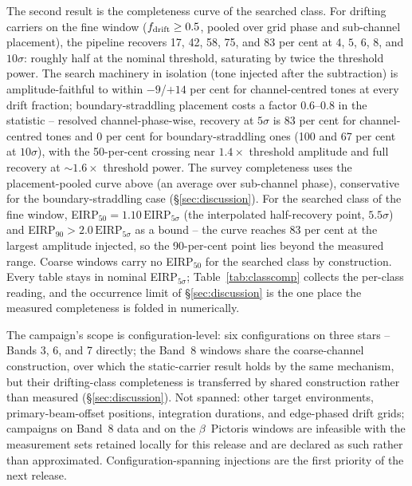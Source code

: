 \documentclass{openjournal}
\begin{document}
The second result is the completeness curve of the searched class.
For drifting carriers on the fine window ($f_{\rm drift}\geq0.5$,
pooled over grid phase and sub-channel placement), the pipeline
recovers 17, 42, 58, 75, and 83 per cent at $4$, $5$, $6$, $8$, and
$10\sigma$: roughly half at the nominal threshold, saturating by
twice the threshold power. The search machinery in isolation (tone
injected after the subtraction) is amplitude-faithful to within
$-9$/$+14$ per cent for channel-centred tones at every drift
fraction; boundary-straddling placement costs a factor $0.6$--$0.8$
in the statistic -- resolved channel-phase-wise, recovery at $5\sigma$
is 83 per cent for channel-centred tones and 0 per cent for
boundary-straddling ones (100 and 67 per cent at $10\sigma$), with
the 50-per-cent crossing near $1.4\times$ threshold amplitude and
full recovery at ${\sim}1.6\times$ threshold power. The survey
completeness uses the placement-pooled curve above (an average over
sub-channel phase), conservative for the boundary-straddling case
(\S\ref{sec:discussion}). For the searched class of the fine window,
EIRP$_{50} = 1.10\,\mathrm{EIRP}_{5\sigma}$ (the interpolated
half-recovery point, $5.5\sigma$) and
EIRP$_{90} > 2.0\,\mathrm{EIRP}_{5\sigma}$ as a bound -- the curve
reaches 83 per cent at the largest amplitude injected, so the
90-per-cent point lies beyond the measured range. Coarse windows
carry no EIRP$_{50}$ for the searched class by construction. Every
table stays in nominal EIRP$_{5\sigma}$; Table~\ref{tab:classcomp}
collects the per-class reading, and the occurrence limit of
\S\ref{sec:discussion} is the one place the measured completeness is
folded in numerically.

The campaign's scope is configuration-level: six configurations on
three stars -- Bands 3, 6, and 7 directly; the Band~8 windows share
the coarse-channel construction, over which the static-carrier result
holds by the same mechanism, but their drifting-class completeness is
transferred by shared construction rather than measured
(\S\ref{sec:discussion}). Not spanned: other target environments,
primary-beam-offset positions, integration durations, and edge-phased
drift grids; campaigns on Band~8 data and on the $\beta$~Pictoris
windows are infeasible with the measurement sets retained locally for
this release and are declared as such rather than approximated.
Configuration-spanning injections are the first priority of the next
release.
\end{document}

